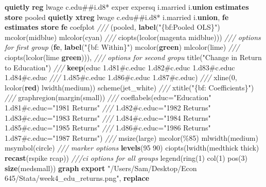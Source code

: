 \documentclass[
]{book}
\newenvironment{Shaded}{\begin{snugshade}}{\end{snugshade}}
\newcommand{\BaseNTok}[1]{\textcolor[rgb]{0.00,0.00,0.81}{#1}}
\newcommand{\CommentTok}[1]{\textcolor[rgb]{0.56,0.35,0.01}{\textit{#1}}}
\newcommand{\DecValTok}[1]{\textcolor[rgb]{0.00,0.00,0.81}{#1}}
\newcommand{\KeywordTok}[1]{\textcolor[rgb]{0.13,0.29,0.53}{\textbf{#1}}}
\newcommand{\NormalTok}[1]{#1}
\newcommand{\StringTok}[1]{\textcolor[rgb]{0.31,0.60,0.02}{#1}}
\begin{document}
\begin{Shaded}
\begin{Highlighting}[]
\KeywordTok{quietly} \KeywordTok{reg}\NormalTok{ lwage c.edu\#\#i.d8* exper expersq i.married i.}\KeywordTok{union}
\KeywordTok{estimates} \KeywordTok{store}\NormalTok{ pooled}
\KeywordTok{quietly} \KeywordTok{xtreg}\NormalTok{ lwage c.edu\#\#i.d8* i.married i.}\KeywordTok{union}\NormalTok{, }\KeywordTok{fe}
\KeywordTok{estimates} \KeywordTok{store} \KeywordTok{fe}
\NormalTok{coefplot }\CommentTok{///}
\NormalTok{      (pooled, }\KeywordTok{label}\NormalTok{(}\StringTok{"\{bf:Pooled OLS\}"}\NormalTok{) mcolor(}\BaseNTok{midblue}\NormalTok{) mlcolor(}\BaseNTok{cyan}\NormalTok{) }\CommentTok{///}
\NormalTok{        ciopts(lcolor(}\BaseNTok{magenta} \BaseNTok{midblue}\NormalTok{))) }\CommentTok{/// options for first group}
\NormalTok{      (}\KeywordTok{fe}\NormalTok{, }\KeywordTok{label}\NormalTok{(}\StringTok{"\{bf: Within\}"}\NormalTok{) mcolor(}\KeywordTok{green}\NormalTok{) mlcolor(}\BaseNTok{lime}\NormalTok{) }\CommentTok{///}
\NormalTok{        ciopts(lcolor(}\BaseNTok{lime} \KeywordTok{green}\NormalTok{))), }\CommentTok{/// options for second gropu}
      \BaseNTok{title}\NormalTok{(}\StringTok{"Change in Return to Education"}\NormalTok{) }\CommentTok{///}
      \KeywordTok{keep}\NormalTok{(educ 1.d81\#c.educ 1.d82\#c.educ 1.d83\#c.educ 1.d84\#c.educ }\CommentTok{///}
\NormalTok{        1.d85\#c.educ 1.d86\#c.educ 1.d87\#c.educ) }\CommentTok{///}
      \BaseNTok{xline}\NormalTok{(0, lcolor(}\KeywordTok{red}\NormalTok{) lwidth(medium)) }\DecValTok{scheme}\NormalTok{(jet\_white) }\CommentTok{///}
      \BaseNTok{xtitle}\NormalTok{(}\StringTok{"\{bf: Coefficients\}"}\NormalTok{) }\CommentTok{///}
\NormalTok{      graphregion(}\BaseNTok{margin}\NormalTok{(small)) }\CommentTok{///}
\NormalTok{      coeflabels(educ=}\StringTok{"Education"}\NormalTok{ 1.d81\#c.educ=}\StringTok{"1981 Returns"} \CommentTok{///}
\NormalTok{        1.d82\#c.educ=}\StringTok{"1982 Returns"}\NormalTok{ 1.d83\#c.educ=}\StringTok{"1983 Returns"} \CommentTok{///}
\NormalTok{        1.d84\#c.educ=}\StringTok{"1984 Returns"}\NormalTok{ 1.d85\#c.educ=}\StringTok{"1985 Returns"} \CommentTok{///}
\NormalTok{        1.d86\#c.educ=}\StringTok{"1986 Returns"}\NormalTok{ 1.d87\#c.educ=}\StringTok{"1987 Returns"}\NormalTok{) }\CommentTok{///}
\NormalTok{      msize(large) mcolor(\%85) mlwidth(medium) }\BaseNTok{msymbol}\NormalTok{(}\BaseNTok{circle}\NormalTok{) }\CommentTok{/// marker options}
      \KeywordTok{levels}\NormalTok{(95 90) ciopts(lwidth(}\BaseNTok{medthick}\NormalTok{ thick) }\KeywordTok{recast}\NormalTok{(rspike rcap)) }\CommentTok{///ci options for all groups}
      \BaseNTok{legend}\NormalTok{(}\BaseNTok{ring}\NormalTok{(1) col(1) pos(3) }\KeywordTok{size}\NormalTok{(medsmall))}
    \KeywordTok{graph} \KeywordTok{export} \StringTok{"/Users/Sam/Desktop/Econ 645/Stata/week4\_edu\_returns.png"}\NormalTok{, }\KeywordTok{replace}
\end{Highlighting}
\end{Shaded}
\end{document}
